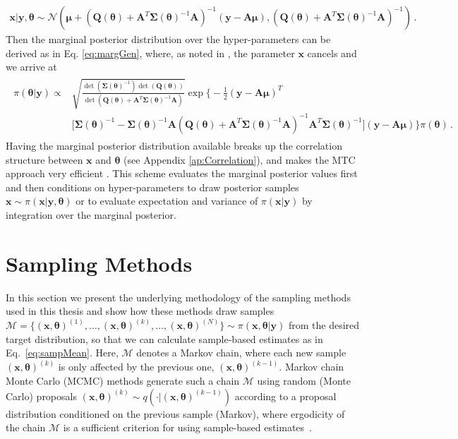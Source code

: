 \begin{align}
	\bm{x} | \bm{y}, \bm{\theta} \sim \mathcal{N}(\bm{\mu} + (\bm{Q}(\bm{\theta}) + \bm{A}^T \bm{\Sigma}(\bm{\theta})^{-1} \bm{A})^{-1}(\bm{y} - \bm{A}\bm{\mu}),(\bm{Q}(\bm{\theta}) + \bm{A}^T \bm{\Sigma}(\bm{\theta})^{-1} \bm{A})^{-1}) \, \label{eq:CondPostLin}.
\end{align}
Then the marginal posterior distribution over the hyper-parameters can be derived as in Eq. \ref{eq:margGen}, where, as noted in \cite{fox2016fast}, the parameter $\bm{x}$ cancels and we arrive at
\begin{align}\begin{split}
		\pi(\bm{\theta} | \bm{y}) \propto & \sqrt{\frac{\det{(\bm{\Sigma}(\bm{\theta})^{-1})} \det{(\bm{Q}(\bm{\theta}))} }{\det{(\bm{Q}(\bm{\theta}) + \bm{A}^T \bm{\Sigma}(\bm{\theta})^{-1} \bm{A})} } }  \exp \Bigg\{  -\frac{1}{2} (\bm{y} - \bm{A} \bm{\mu})^T \\ &\big[ \bm{\Sigma}(\bm{\theta})^{-1} - \bm{\Sigma}(\bm{\theta})^{-1} \bm{A}  (\bm{Q}(\bm{\theta}) + \bm{A}^T \bm{\Sigma}(\bm{\theta})^{-1} \bm{A})^{-1} \bm{A}^T \bm{\Sigma} (\bm{\theta})^{-1} \big] (\bm{y} - \bm{A} \bm{\mu}) \Bigg\} \pi(\bm{\theta}) \, .
	\end{split} 
\end{align} 
Having the marginal posterior distribution available breaks up the correlation structure between $\bm{x}$ and $\bm{\theta}$ (see Appendix \ref{ap:Correlation}), and makes the MTC approach very efficient \cite{fox2016fast}.
This scheme evaluates the marginal posterior values first and then conditions on hyper-parameters to draw posterior samples $\bm{x} \sim \pi (\bm{x} | \bm{y}, \bm{\theta})$ or to evaluate expectation and variance of $\pi(\bm{x}| \bm{y})$ by integration over the marginal posterior.




\section{Sampling Methods}
\label{sec:sampling}
In this section we present the underlying methodology of the sampling methods used in this thesis and show how these methods draw samples \newline$ \mathcal{M} = \{ (\bm{x}, \bm{\theta} )^{(1)}, \dots, (\bm{x}, \bm{\theta} )^{(k)}, \dots, (\bm{x}, \bm{\theta})^{(N)} \} \sim \pi(\bm{x}, \bm{\theta} |  \bm{y})$ from the desired target distribution, so that we can calculate sample-based estimates as in Eq.~\ref{eq:sampMean}.
Here, $\mathcal{M}$ denotes a Markov chain, where each new sample $(\bm{x}, \bm{\theta})^{(k)}$ is only affected by the previous one, $(\bm{x}, \bm{\theta})^{(k-1)}$.
Markov chain Monte Carlo (MCMC) methods generate such a chain $\mathcal{M}$ using random (Monte Carlo) proposals $(\bm{x}, \bm{\theta})^{(k)} \sim q( \cdot |  (\bm{x}, \bm{\theta})^{(k-1)})$ according to a proposal distribution conditioned on the previous sample (Markov), where ergodicity of the chain $\mathcal{M}$ is a sufficient criterion for using sample-based estimates~\cite{tan2016LecNot, roberts2004general}.


